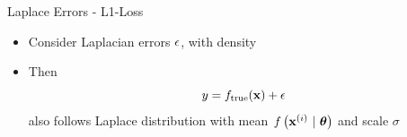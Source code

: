 \documentclass[11pt,compress,t,notes=noshow, xcolor=table]{beamer}
\begin{document}
\begin{vbframe}{Laplace Errors - L1-Loss}

\begin{itemize}
    \item Consider Laplacian errors $\epsilon$, with density 
\end{itemize}
\lz

\begin{itemize}
\item Then
$$
y = f_{\text{true}}(\mathbf{x}) + \epsilon 
$$
also follows Laplace distribution with mean $f\left(\mathbf{x}^{(i)} ~|~ \bm{\theta}\right)$ and scale  $\sigma$ 
\end{itemize}

\end{vbframe}
\end{document}
